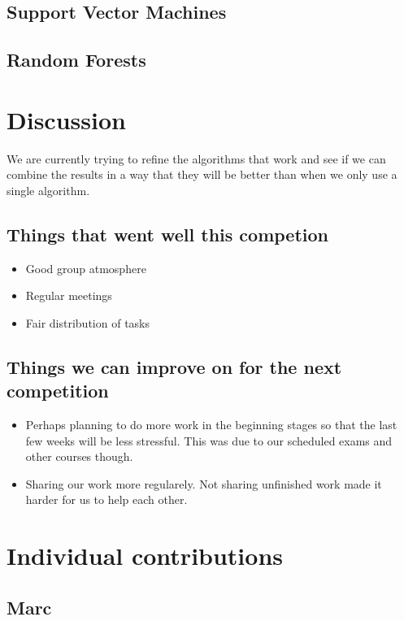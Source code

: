 \documentclass{article}
\begin{document}
\subsection{Support Vector Machines}

\subsection{Random Forests}

\section{Discussion}

We are currently trying to refine the algorithms that work and see if we can combine the results in a way that they will be better than when we only use a single algorithm.\\

\subsection{Things that went well this competion}

\begin{itemize}
\item Good group atmosphere
\item Regular meetings
\item Fair distribution of tasks
\end{itemize}

\subsection{Things we can improve on for the next competition}

\begin{itemize}
\item Perhaps planning to do more work in the beginning stages so that the last few weeks will be less stressful. This was due to our scheduled exams and other courses though.
\item Sharing our work more regularely. Not sharing unfinished work made it harder for us to help each other.
\end{itemize}

\section{Individual contributions}

\subsection{Marc}
\end{document}
